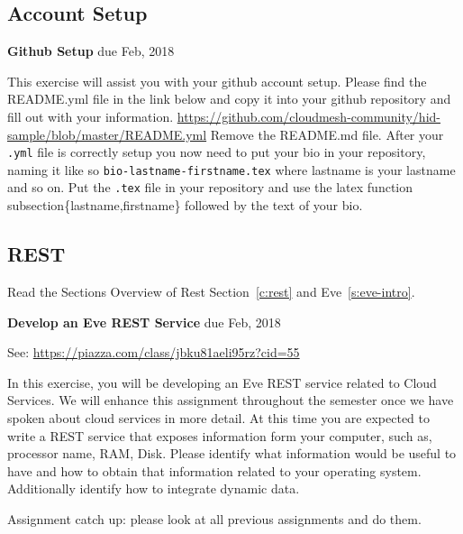 \subsection{Account Setup}

\begin{exercise} {\bf Github Setup} due Feb, 2018

This exercise will assist you with your github account setup. Please
find the README.yml file in the link below and copy it into your
github repository and fill out with your
information. \url{https://github.com/cloudmesh-community/hid-sample/blob/master/README.yml}
Remove the README.md file. After your \verb|.yml| file is correctly setup you
now need to put your bio in your repository, naming it like so
\verb|bio-lastname-firstname.tex| where lastname is your lastname and so
on. Put the \verb|.tex| file in your repository and use the latex function
subsection\{lastname,firstname\} followed by the text of your bio.


\end{exercise}

\subsection{REST}
\label{E:REST-a}
\begin{exercise}
Read the Sections Overview of Rest Section~\ref{c:rest} and Eve~\ref{s:eve-intro}.
\end{exercise}

\begin{exercise} {\bf Develop an Eve REST Service} due Feb, 2018

See: \url{https://piazza.com/class/jbku81aeli95rz?cid=55}

In this exercise, you will be developing an Eve REST service related
to Cloud Services. We will enhance this assignment throughout the
semester once we have spoken about cloud services in more detail. At
this time you are expected to write a REST service that exposes
information form your computer, such as, processor name, RAM,
Disk. Please identify what information would be useful to have and how
to obtain that information related to your operating
system. Additionally identify how to integrate dynamic data.


\end{exercise}

\begin{exercise}
Assignment catch up: please look at all previous assignments and do
them. 
\end{exercise}

